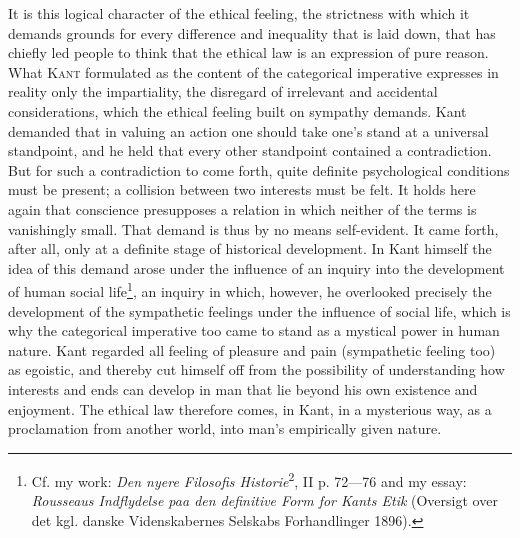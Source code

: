 \documentclass[12pt,a4paper,openany]{book}
\newcommand{\opage}[1]{\marginnote{\footnotesize\textit{[#1]}}}
\begin{document}
It is this logical character of the ethical feeling, the strictness with which it demands grounds
for every difference and inequality that is laid down, that has chiefly led people to think that the
ethical law is an expression of pure reason. What \textsc{Kant} formulated as the content of the
categorical imperative expresses in reality only the impartiality, the disregard of irrelevant and
accidental considerations, which the ethical feeling built on sympathy demands. Kant demanded that in
valuing an action one should take one's stand at a universal standpoint, and he held that every other
standpoint contained a contradiction. But for such a contradiction to come forth, quite definite
psychological conditions must be present; a collision between two interests must be felt. It holds
here again that conscience presupposes a relation in which neither of the terms is vanishingly small.
That demand is thus by no means self-evident. It came forth, after all, only at a definite stage of
historical development. In Kant himself the idea of this demand arose under the influence of an
inquiry into the development of human social life\footnote[1]{Cf. my work: \textit{Den nyere
Filosofis Historie}\textsuperscript{2}, II p. 72---76 and my essay: \textit{Rousseaus Indflydelse paa
den definitive Form for Kants Etik} (Oversigt over det kgl. danske Videnskabernes Selskabs
Forhandlinger 1896).}, an inquiry in which, however, he overlooked precisely the development of the
sympathetic feelings under the influence of social life, which is why the categorical imperative too
came to stand as a mystical power in human nature. Kant regarded all feeling of pleasure and pain
(sympathetic feeling too) as egoistic, and thereby cut himself off from the possibility of
understanding how interests and ends can develop in man that lie beyond his own existence and
enjoyment.
The ethical law therefore comes, in
\opage{42}Kant, in a mysterious way, as a proclamation from another world, into man's empirically given
nature.
\end{document}
